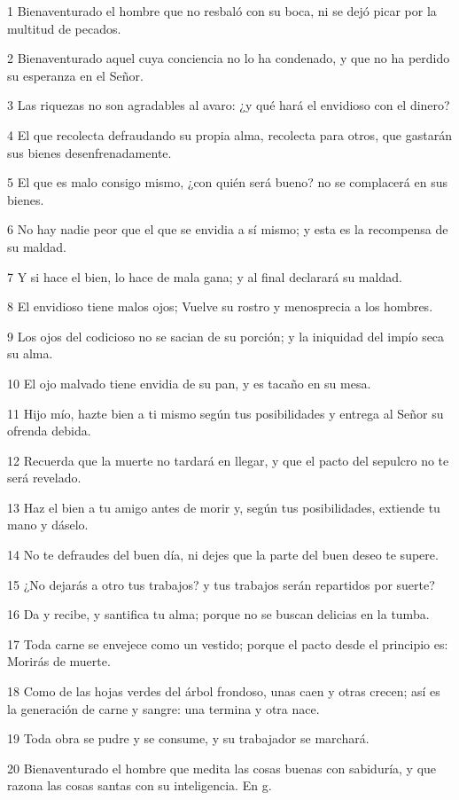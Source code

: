 \par 1 Bienaventurado el hombre que no resbaló con su boca, ni se dejó picar por la multitud de pecados.
\par 2 Bienaventurado aquel cuya conciencia no lo ha condenado, y que no ha perdido su esperanza en el Señor.
\par 3 Las riquezas no son agradables al avaro: ¿y qué hará el envidioso con el dinero?
\par 4 El que recolecta defraudando su propia alma, recolecta para otros, que gastarán sus bienes desenfrenadamente.
\par 5 El que es malo consigo mismo, ¿con quién será bueno? no se complacerá en sus bienes.
\par 6 No hay nadie peor que el que se envidia a sí mismo; y esta es la recompensa de su maldad.
\par 7 Y si hace el bien, lo hace de mala gana; y al final declarará su maldad.
\par 8 El envidioso tiene malos ojos; Vuelve su rostro y menosprecia a los hombres.
\par 9 Los ojos del codicioso no se sacian de su porción; y la iniquidad del impío seca su alma.
\par 10 El ojo malvado tiene envidia de su pan, y es tacaño en su mesa.
\par 11 Hijo mío, hazte bien a ti mismo según tus posibilidades y entrega al Señor su ofrenda debida.
\par 12 Recuerda que la muerte no tardará en llegar, y que el pacto del sepulcro no te será revelado.
\par 13 Haz el bien a tu amigo antes de morir y, según tus posibilidades, extiende tu mano y dáselo.
\par 14 No te defraudes del buen día, ni dejes que la parte del buen deseo te supere.
\par 15 ¿No dejarás a otro tus trabajos? y tus trabajos serán repartidos por suerte?
\par 16 Da y recibe, y santifica tu alma; porque no se buscan delicias en la tumba.
\par 17 Toda carne se envejece como un vestido; porque el pacto desde el principio es: Morirás de muerte.
\par 18 Como de las hojas verdes del árbol frondoso, unas caen y otras crecen; así es la generación de carne y sangre: una termina y otra nace.
\par 19 Toda obra se pudre y se consume, y su trabajador se marchará.
\par 20 Bienaventurado el hombre que medita las cosas buenas con sabiduría, y que razona las cosas santas con su inteligencia. En g.
